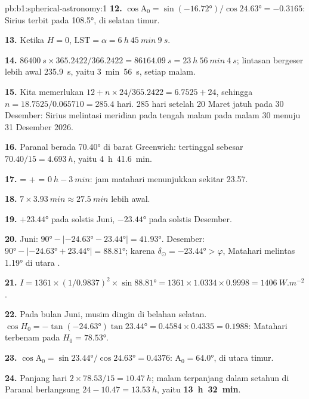 \begin{solution}{pb:b1:spherical-astronomy:1}
\textbf{12.} $\cos\mathrm{A}_0 = \sin(\ang{-16.72})/\cos\ang{24.63} =
-0.3165$: Sirius terbit pada  \ang{108.5}, di selatan timur.

\textbf{13.} Ketika $H = 0$, $\mathrm{LST} = \alpha = \qty{6}{h}~\qty{45}{min}~\qty{9}{s}$.

\textbf{14.} $\qty{86400}{s}\times365.2422/366.2422 = \qty{86164.09}{s} =
\qty{23}{h}~\qty{56}{min}~\qty{4}{s}$; lintasan bergeser lebih awal
\qty{235.9}{s}, yaitu \qty{3}{min}~\qty{56}{s}, setiap malam.

\textbf{15.} Kita memerlukan $12 + n\times24/365.2422 = 6.7525 + 24$, sehingga
$n = 18.7525/0.065710 = 285.4$ hari. 285 hari setelah 20 Maret jatuh pada
30 Desember: Sirius melintasi meridian pada tengah malam  pada malam
30 menuju 31 Desember 2026.

\textbf{16.} Paranal berada \ang{70.40} di barat Greenwich: 
tertinggal sebesar $70.40/15 = \qty{4.693}{h}$, yaitu \qty{4}{h}~\qty{41.6}{min}.

\textbf{17.}  =  +  =
$\qty{0}{h} - \qty{3}{min}$: jam matahari menunjukkan sekitar 23.57.

\textbf{18.} $7\times\qty{3.93}{min} \approx \qty{27.5}{min}$ lebih awal.

\textbf{19.} $+\ang{23.44}$ pada solstis Juni, $-\ang{23.44}$ pada
solstis Desember.

\textbf{20.} Juni: $\ang{90} - |\ang{-24.63} - \ang{23.44}| = \ang{41.93}$.
Desember: $\ang{90} - |\ang{-24.63} + \ang{23.44}| = \ang{88.81}$; karena
$\delta_\odot = \ang{-23.44} > \varphi$, Matahari melintas \ang{1.19} di utara
.

\textbf{21.} $I = 1361\times(1/0.9837)^2\times\sin\ang{88.81} = 1361\times
1.0334\times0.9998 = \qty{1406}{W.m^{-2}}$.

\textbf{22.} Pada bulan Juni, musim dingin di belahan selatan. $\cos H_0 = -\tan(\ang{-24.63})
\tan\ang{23.44} = 0.4584\times0.4335 = 0.1988$: Matahari terbenam pada 
$H_0 = \ang{78.53}$.

\textbf{23.} $\cos\mathrm{A}_0 = \sin\ang{23.44}/\cos\ang{24.63} = 0.4376$:
$\mathrm{A}_0 = \ang{64.0}$, di utara timur.

\textbf{24.} Panjang hari $2\times78.53/15 = \qty{10.47}{h}$; malam terpanjang
dalam setahun di Paranal berlangsung $24 - 10.47 = \qty{13.53}{h}$, yaitu
\textbf{\qty[text-series-to-math=true]{13}{h}~\qty[text-series-to-math=true]{32}{min}}.
\end{solution}

